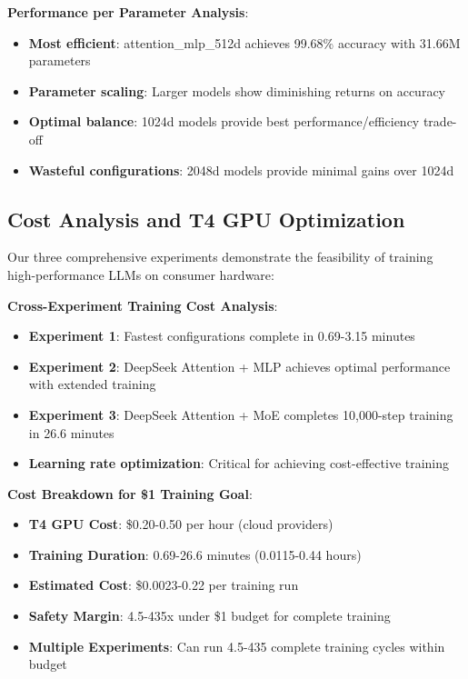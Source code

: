 \documentclass[11pt,a4paper]{article}
\begin{document}
\textbf{Performance per Parameter Analysis}:
\begin{itemize}
    \item \textbf{Most efficient}: attention\_mlp\_512d achieves 99.68\% accuracy with 31.66M parameters
    \item \textbf{Parameter scaling}: Larger models show diminishing returns on accuracy
    \item \textbf{Optimal balance}: 1024d models provide best performance/efficiency trade-off
    \item \textbf{Wasteful configurations}: 2048d models provide minimal gains over 1024d
\end{itemize}

\subsection{Cost Analysis and T4 GPU Optimization}

Our three comprehensive experiments demonstrate the feasibility of training high-performance LLMs on consumer hardware:

\textbf{Cross-Experiment Training Cost Analysis}:
\begin{itemize}
    \item \textbf{Experiment 1}: Fastest configurations complete in 0.69-3.15 minutes
    \item \textbf{Experiment 2}: DeepSeek Attention + MLP achieves optimal performance with extended training
    \item \textbf{Experiment 3}: DeepSeek Attention + MoE completes 10,000-step training in 26.6 minutes
    \item \textbf{Learning rate optimization}: Critical for achieving cost-effective training
\end{itemize}

\textbf{Cost Breakdown for \$1 Training Goal}:
\begin{itemize}
    \item \textbf{T4 GPU Cost}: \$0.20-0.50 per hour (cloud providers)
    \item \textbf{Training Duration}: 0.69-26.6 minutes (0.0115-0.44 hours)
    \item \textbf{Estimated Cost}: \$0.0023-0.22 per training run
    \item \textbf{Safety Margin}: 4.5-435x under \$1 budget for complete training
    \item \textbf{Multiple Experiments}: Can run 4.5-435 complete training cycles within budget
\end{itemize}
\end{document}
